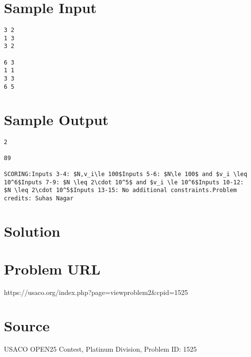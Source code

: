 \documentclass[12pt]{article}
\begin{document}
\section*{Sample Input}
\begin{verbatim}
3 2
1 3
3 2

6 3
1 1
3 3
6 5
\end{verbatim}

\section*{Sample Output}
\begin{verbatim}
2

89

SCORING:Inputs 3-4: $N,v_i\le 100$Inputs 5-6: $N\le 100$ and $v_i \leq 10^6$Inputs 7-9: $N \leq 2\cdot 10^5$ and $v_i \le 10^6$Inputs 10-12: $N \leq 2\cdot 10^5$Inputs 13-15: No additional constraints.Problem credits: Suhas Nagar
\end{verbatim}

\section*{Solution}


\section*{Problem URL}
https://usaco.org/index.php?page=viewproblem2&cpid=1525

\section*{Source}
USACO OPEN25 Contest, Platinum Division, Problem ID: 1525
\end{document}
